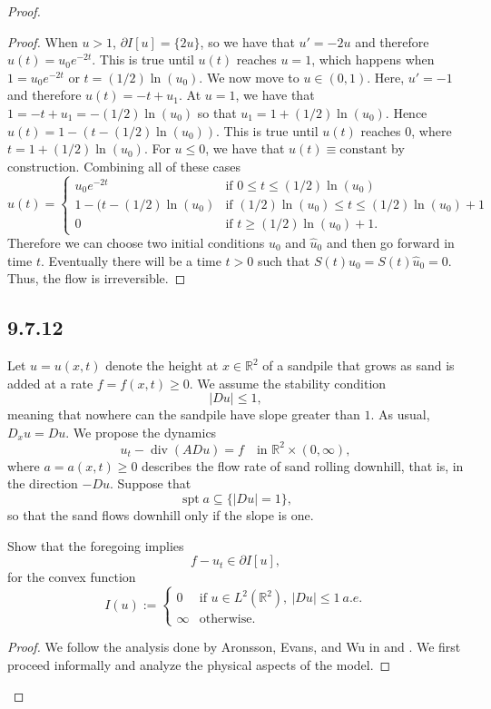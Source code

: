 \documentclass{article}
\begin{document}
\begin{flushleft}
\begin{proof}
\begin{proof}
When $u>1$, $\partial I[u]=\{2u\}$, so we have that $u'=-2u$ and therefore $u(t)=u_0e^{-2t}$. This is true until $u(t)$ reaches $u=1$, which happens when $1 = u_0e^{-2t}$ or $t= (1/2)\ln(u_0).$ We now move to $u\in (0,1)$. Here, $u'=-1$ and therefore $u(t)=-t+u_1.$ At $u=1$, we have that $1=-t+u_1=-(1/2)\ln(u_0)$ so that $u_1 = 1+(1/2)\ln(u_0)$. Hence $u(t)=1-(t-(1/2)\ln(u_0))$. This is true until $u(t)$ reaches $0$, where $t=1+(1/2)\ln(u_0)$. For $u \leq 0$, we have that $u(t)\equiv \text{constant}$ by construction. Combining all of these cases
$$u(t)=
  \begin{cases} 
      u_0e^{-2t} & \text{if $0\leq t \leq (1/2)\ln(u_0)$}\\
      1-(t-(1/2)\ln(u_0) & \text{if $(1/2)\ln(u_0) \leq t \leq (1/2)\ln(u_0) + 1$}\\
      0 & \text{if $t\geq (1/2)\ln(u_0) + 1$}.
   \end{cases}
$$
Therefore we can choose two initial conditions $u_0$ and $\hat{u}_0$ and then go forward in time $t$. Eventually there will be a time $t>0$ such that $S(t)u_0=S(t)\hat{u}_0=0$. Thus, the flow is irreversible.


\end{proof}
\subsection{\textbf{9.7.12}} Let $u=u(x,t)$ denote the height at $x\in\mathbb R^2$ of a sandpile that grows as sand is added at a rate $f=f(x,t)\geq 0$. We assume the stability condition
$$|Du|\leq 1,$$
meaning that nowhere can the sandpile have slope greater than $1$. As usual, $D_xu=Du$. We propose the dynamics
$$u_t - \operatorname{div}(ADu)=f\quad\text{in $\mathbb R^2 \times (0,\infty)$},$$
where $a=a(x,t)\geq 0$ describes the flow rate of sand rolling downhill, that is, in the direction $-Du$. Suppose that 
$$\operatorname{spt}a \subseteq \{|Du|=1\},$$
so that the sand flows downhill only if the slope is one.

Show that the foregoing implies
$$f-u_t\in \partial I[u],$$
for the convex function
$$I(u):=
  \begin{cases} 
      0 & \text{if $u\in L^2(\mathbb R^2),~ |Du|\leq 1~a.e.$} \\
      \infty & \text{otherwise}.
   \end{cases}
$$
\begin{proof}
We follow the analysis done by Aronsson, Evans, and Wu in \cite{ARONSSON1996304} and \cite{evans1997partial}. We first proceed informally and analyze the physical aspects of the model.


\end{proof}
\end{proof}
\end{flushleft}
\end{document}
